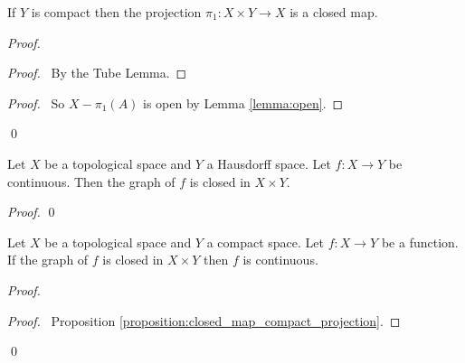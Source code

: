 \begin{proposition}
    \label{proposition:closed_map_compact_projection}
    If $Y$ is compact then the projection $\pi_1 : X \times Y \rightarrow X$
    is a closed map.
\end{proposition}

\begin{proof}
    \pf
    \begin{proof}
        \pf\ By the Tube Lemma.
    \end{proof}
    \qedstep
    \begin{proof}
        \pf\ So $X - \pi_1(A)$ is open by Lemma \ref{lemma:open}.
    \end{proof}
    \qed
\end{proof}

\begin{proposition}
    \label{proposition:graph_closed}
    Let $X$ be a topological space and $Y$ a Hausdorff space.
    Let $f : X \rightarrow Y$ be continuous. Then the graph of $f$
    is closed in $X \times Y$.
\end{proposition}

\begin{proof}
    \qed
\end{proof}

\begin{theorem}
    Let $X$ be a topological space and $Y$ a compact space. Let $f : X \rightarrow Y$ be a function. 
    If the graph of $f$ is closed in $X \times Y$ then $f$ is continuous.
\end{theorem}

\begin{proof}
    \pf
        \begin{proof}
            \pf\ Proposition \ref{proposition:closed_map_compact_projection}.
        \end{proof}
    \qed
\end{proof}

